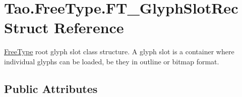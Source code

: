 \hypertarget{struct_tao_1_1_free_type_1_1_f_t___glyph_slot_rec}{
\section{Tao.FreeType.FT\_\-GlyphSlotRec Struct Reference}
\label{struct_tao_1_1_free_type_1_1_f_t___glyph_slot_rec}
}


\hyperlink{namespace_tao_1_1_free_type}{FreeType} root glyph slot class structure. A glyph slot is a container where individual glyphs can be loaded, be they in outline or bitmap format.  


\subsection*{Public Attributes}
